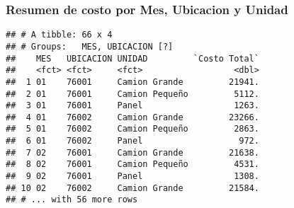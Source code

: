\documentclass[]{article}
\newenvironment{Shaded}{\begin{snugshade}}{\end{snugshade}}
\newcommand{\KeywordTok}[1]{\textcolor[rgb]{0.13,0.29,0.53}{\textbf{#1}}}
\newcommand{\DataTypeTok}[1]{\textcolor[rgb]{0.13,0.29,0.53}{#1}}
\newcommand{\StringTok}[1]{\textcolor[rgb]{0.31,0.60,0.02}{#1}}
\newcommand{\OperatorTok}[1]{\textcolor[rgb]{0.81,0.36,0.00}{\textbf{#1}}}
\newcommand{\NormalTok}[1]{#1}
\begin{document}
\subsubsection{Resumen de costo por Mes, Ubicacion y
Unidad}\label{resumen-de-costo-por-mes-ubicacion-y-unidad}

\begin{Shaded}
\end{Shaded}

\begin{verbatim}
## # A tibble: 66 x 4
## # Groups:   MES, UBICACION [?]
##    MES   UBICACION UNIDAD         `Costo Total`
##    <fct> <fct>     <fct>                  <dbl>
##  1 01    76001     Camion Grande         21941.
##  2 01    76001     Camion Pequeño         5112.
##  3 01    76001     Panel                  1263.
##  4 01    76002     Camion Grande         23266.
##  5 01    76002     Camion Pequeño         2863.
##  6 01    76002     Panel                   972.
##  7 02    76001     Camion Grande         21638.
##  8 02    76001     Camion Pequeño         4531.
##  9 02    76001     Panel                  1308.
## 10 02    76002     Camion Grande         21584.
## # ... with 56 more rows
\end{verbatim}
\end{document}

